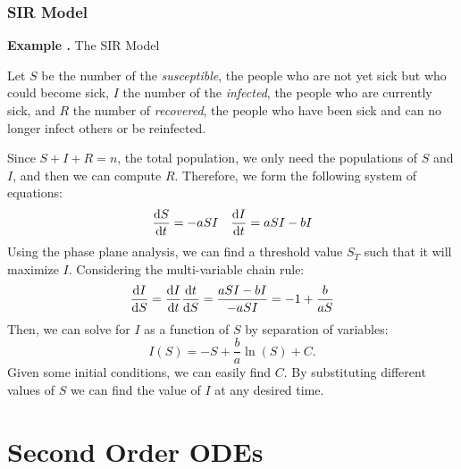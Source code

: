 \documentclass[12pt, a4paper]{article}
\newcounter{index}[subsection]
\newenvironment*{eg}{\begin{framed}\par\noindent\textbf{Example \thesubsection.\stepcounter{index}\theindex}}{\par\end{framed}}
\def\dsst{\displaystyle}
\begin{document}
\subsubsection{SIR Model}
\begin{eg}
	The SIR Model\par 
	Let $S$ be the number of the \textit{susceptible}, the people who are not yet sick but who could become sick, $I$ the number of the \textit{infected}, the people who are currently sick, and $R$ the number of \textit{recovered}, the people who have been sick and can no longer infect others or be reinfected.\par 
	Since $S+I+R=n$, the total population, we only need the populations of $S$ and $I$, and then we can compute $R$. Therefore, we form the following system of equations: 
	\[\dsst\dv{S}{t}=-aSI\quad \dv{I}{t}=aSI-bI\]
	Using the phase plane analysis, we can find a threshold value $S_T$ such that it will maximize $I$. Considering the multi-variable chain rule: \[\dv{I}{S}=\dv{I}{t}\dv{t}{S}=\dfrac{aSI-bI}{-aSI}=-1+\dfrac{b}{aS}\] Then, we can solve for $I$ as a function of $S$ by separation of variables: \[I(S)=-S+\dfrac{b}{a}\ln(S)+C.\] Given some initial conditions, we can easily find $C$. By substituting different values of $S$ we can find the value of $I$ at any desired time. 
\end{eg}


\newpage
\section{Second Order ODEs}
\end{document}
